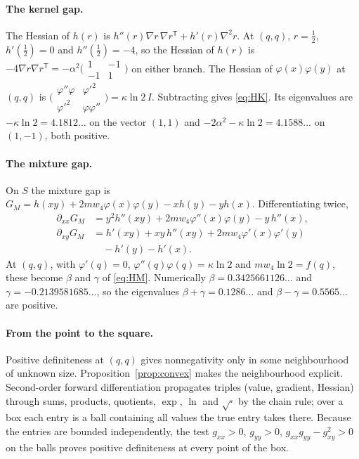 \documentclass[12pt]{article}
\theoremstyle{plain}
\begin{document}
\paragraph*{The kernel gap.} The Hessian of $h(r)$ is $h''(r)\nabla r\,\nabla r^{\mathsf T}+h'(r)\nabla^2r$. At $(q,q)$, $r=\frac12$, $h'(\frac12)=0$ and $h''(\frac12)=-4$, so the Hessian of $h(r)$ is $-4\nabla r\nabla r^{\mathsf T}=-\alpha^2\bigl(\begin{smallmatrix}1&-1\\-1&1\end{smallmatrix}\bigr)$ on either branch. The Hessian of $\varphi(x)\varphi(y)$ at $(q,q)$ is $\bigl(\begin{smallmatrix}\varphi''\varphi&\varphi'^2\\ \varphi'^2&\varphi\varphi''\end{smallmatrix}\bigr)=\kappa\ln 2\,I$. Subtracting gives \eqref{eq:HK}. Its eigenvalues are $-\kappa\ln 2=4.1812\ldots$ on the vector $(1,1)$ and $-2\alpha^2-\kappa\ln2=4.1588\ldots$ on $(1,-1)$, both positive.

\paragraph*{The mixture gap.} On $S$ the mixture gap is $G_M=h(xy)+2mw_4\varphi(x)\varphi(y)-xh(y)-yh(x)$. Differentiating twice,
\begin{align*}
\partial_{xx}G_M&=y^2h''(xy)+2mw_4\varphi''(x)\varphi(y)-y\,h''(x),\\
\partial_{xy}G_M&=h'(xy)+xy\,h''(xy)+2mw_4\varphi'(x)\varphi'(y)\\&\quad-h'(y)-h'(x).
\end{align*}
At $(q,q)$, with $\varphi'(q)=0$, $\varphi''(q)\varphi(q)=\kappa\ln2$ and $mw_4\ln 2=f(q)$, these become $\beta$ and $\gamma$ of \eqref{eq:HM}. Numerically $\beta=0.3425661126\ldots$ and $\gamma=-0.2139581685\ldots$, so the eigenvalues $\beta+\gamma=0.1286\ldots$ and $\beta-\gamma=0.5565\ldots$ are positive.

\paragraph*{From the point to the square.} Positive definiteness at $(q,q)$ gives nonnegativity only in some neighbourhood of unknown size. Proposition~\ref{prop:convex} makes the neighbourhood explicit. Second-order forward differentiation propagates triples (value, gradient, Hessian) through sums, products, quotients, $\exp$, $\ln$ and $\sqrt{\cdot}$ by the chain rule; over a box each entry is a ball containing all values the true entry takes there. Because the entries are bounded independently, the test $g_{xx}>0$, $g_{yy}>0$, $g_{xx}g_{yy}-g_{xy}^2>0$ on the balls proves positive definiteness at every point of the box.
\end{document}
